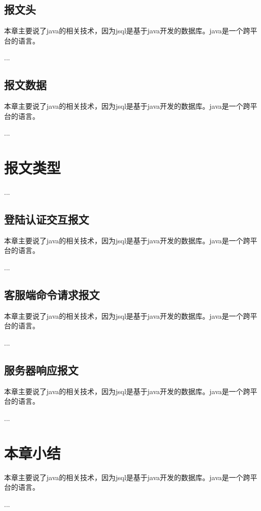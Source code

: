 \subsection{报文头}
本章主要说了java的相关技术，因为jsql是基于java开发的数据库。java是一个跨平台的语言。

...
\subsection{报文数据}
本章主要说了java的相关技术，因为jsql是基于java开发的数据库。java是一个跨平台的语言。

...
\section{报文类型}
...
\subsection{登陆认证交互报文}
本章主要说了java的相关技术，因为jsql是基于java开发的数据库。java是一个跨平台的语言。

...
\subsection{客服端命令请求报文}
本章主要说了java的相关技术，因为jsql是基于java开发的数据库。java是一个跨平台的语言。

...
\subsection{服务器响应报文}
本章主要说了java的相关技术，因为jsql是基于java开发的数据库。java是一个跨平台的语言。

...
\section{本章小结}
本章主要说了java的相关技术，因为jsql是基于java开发的数据库。java是一个跨平台的语言。

...